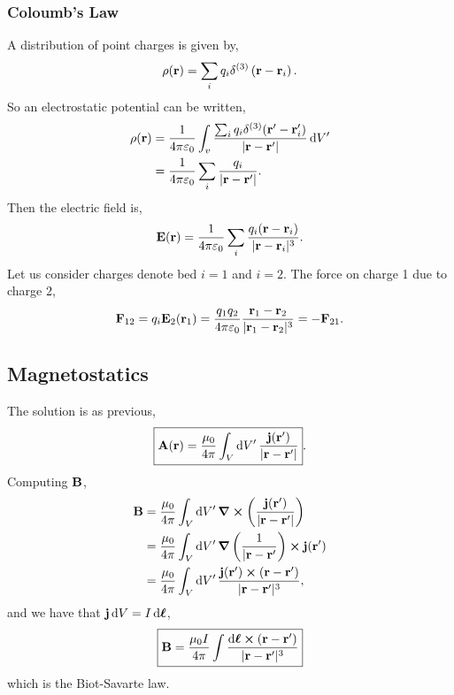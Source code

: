 \documentclass{book}
\begin{document}
\subsubsection{Coloumb's Law}
A distribution of point charges is given by,
\begin{equation}
	\rho(\vb{r}) = \sum_i q_i\delta^{(3)}\left(\vb{r}-\vb{r}_i\right).
\end{equation}
So an electrostatic potential can be written,
\begin{equation}
	\begin{split}
		\rho(\vb{r}) &= \frac{1}{4\pi\varepsilon_0}\int_v\dfrac{\sum_iq_i\delta^{(3)}(\vb{r}' - \vb{r}'_i)}{|\vb{r}-\vb{r}'|} \dd{V'} \\
		& = \frac{1}{4\pi\varepsilon_0}\sum_i \frac{q_i}{|\vb{r}-\vb{r}'|}.
	\end{split}
\end{equation}
Then the electric field is,
\begin{equation}
	\vb{E}(\vb{r}) = \frac{1}{4\pi\varepsilon_0}\sum_i \frac{q_i(\vb{r} -\vb{r}_i)}{|\vb{r}-\vb{r}_i|^3}.
\end{equation}
Let us consider charges denote bed $i=1$ and $i=2$. The force on charge 1 due to charge 2,
\begin{equation}
	\vb{F}_{12} = q_i\vb{E}_2(\vb{r}_1) = \frac{q_1q_2}{4\pi\varepsilon_0}\frac{\vb{r}_1 - \vb{r}_2}{|\vb{r}_1 -\vb{r}_2|^3} = -\vb{F}_{21}.
\end{equation}
\subsection{Magnetostatics}
The solution is as previous,
\begin{equation}
	\boxed{\vb{A}(\vb{r}) = \frac{\mu_0}{4\pi}\int_V\dd{V'}\frac{\vb{j}(\vb{r}')}{|\vb{r}-\vb{r}'|}}.
\end{equation}
Computing $\vb{B}$,
\begin{equation}
	\begin{split}
		\vb{B} &= \frac{\mu_0}{4\pi}\int_V\dd{V'}\curl{\left(\frac{\vb{j}(\vb{r}')}{|\vb{r} - \vb{r}'|}\right)} \\
		& = \frac{\mu_0}{4\pi}\int_V\dd{V'} \grad \left(\frac{1}{|\vb{r} - \vb{r}'}\right)\cross \vb{j}(\vb{r}') \\
		& = \frac{\mu_0}{4\pi}\int_V\dd{V'} \frac{\vb{j}(\vb{r}')\cross(\vb{r} - \vb{r}')}{|\vb{r} - \vb{r}'|^3},
	\end{split}
\end{equation}
and we have that $\vb{j} \dd{V} = I \dd{\vb*{\ell}}$,
\begin{equation}
	\boxed{\vb{B} = \frac{\mu_0 I}{4\pi} \int \frac{\dd{\vb*{\ell}}\cross(\vb{r} - \vb{r}')}{|\vb{r} - \vb{r}'|^3}}
\end{equation}
which is the Biot-Savarte law.
\end{document}
